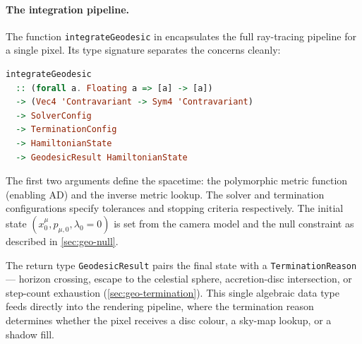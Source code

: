 \paragraph{The integration pipeline.}

The function \texttt{integrateGeodesic} in
 encapsulates the full ray-tracing
pipeline for a single pixel.  Its type signature separates the
concerns cleanly:
%
\begin{lstlisting}[language=Haskell]
integrateGeodesic
  :: (forall a. Floating a => [a] -> [a])
  -> (Vec4 'Contravariant -> Sym4 'Contravariant)
  -> SolverConfig
  -> TerminationConfig
  -> HamiltonianState
  -> GeodesicResult HamiltonianState
\end{lstlisting}
%
The first two arguments define the spacetime: the polymorphic metric
function (enabling AD) and the inverse metric lookup.  The solver and
termination configurations specify tolerances and stopping criteria
respectively.  The initial state $(x^\mu_0, p_{\mu,0},
\lambda_0 = 0)$ is set from the camera model and the null constraint
as described in \cref{sec:geo-null}.

The return type \texttt{GeodesicResult} pairs the final state with a
\texttt{TerminationReason} --- horizon crossing, escape to the
celestial sphere, accretion-disc intersection, or step-count
exhaustion (\cref{sec:geo-termination}).  This single algebraic data
type feeds directly into the rendering pipeline, where the
termination reason determines whether the pixel receives a disc
colour, a sky-map lookup, or a shadow fill.
